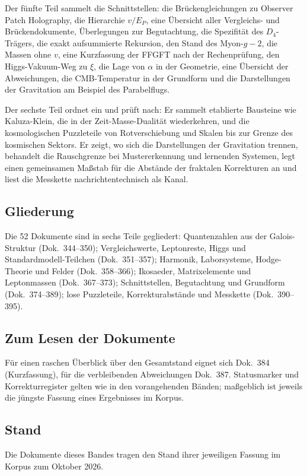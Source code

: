 Der fünfte Teil sammelt die Schnittstellen: die Brückengleichungen zu
Observer Patch Holography, die Hierarchie $v/E_P$, eine Übersicht aller
Vergleichs- und Brückendokumente, Überlegungen zur Begutachtung, die
Spezifität des $D_4$-Trägers, die exakt aufsummierte Rekursion, den Stand
des Myon-$g-2$, die Massen ohne $v$, eine Kurzfassung der FFGFT nach der
Rechenprüfung, den Higgs-Vakuum-Weg zu $\xi$, die Lage von $\alpha$ in der
Geometrie, eine Übersicht der Abweichungen, die CMB-Temperatur in der
Grundform und die Darstellungen der Gravitation am Beispiel des
Parabelflugs.

Der sechste Teil ordnet ein und prüft nach: Er sammelt etablierte Bausteine
wie Kaluza-Klein, die in der Zeit-Masse-Dualität wiederkehren, und die
kosmologischen Puzzleteile von Rotverschiebung und Skalen bis zur Grenze des
kosmischen Sektors. Er zeigt, wo sich die Darstellungen der Gravitation
trennen, behandelt die Rauschgrenze bei Mustererkennung und lernenden
Systemen, legt einen gemeinsamen Maßstab für die Abstände der fraktalen
Korrekturen an und liest die Messkette nachrichtentechnisch als Kanal.

\subsection*{Gliederung}

Die 52 Dokumente sind in sechs Teile gegliedert: Quantenzahlen aus der
Galois-Struktur (Dok.~344--350); Vergleichswerte, Leptonreste, Higgs und
Standardmodell-Teilchen (Dok.~351--357); Harmonik, Laborsysteme,
Hodge-Theorie und Felder (Dok.~358--366); Ikosaeder, Matrixelemente und
Leptonmassen (Dok.~367--373); Schnittstellen, Begutachtung und Grundform
(Dok.~374--389); lose Puzzleteile, Korrekturabstände und Messkette
(Dok.~390--395).

\subsection*{Zum Lesen der Dokumente}

Für einen raschen Überblick über den Gesamtstand eignet sich Dok.~384
(Kurzfassung), für die verbleibenden Abweichungen Dok.~387. Statusmarker
und Korrekturregister gelten wie in den vorangehenden Bänden; maßgeblich ist
jeweils die jüngste Fassung eines Ergebnisses im Korpus.

\subsection*{Stand}

Die Dokumente dieses Bandes tragen den Stand ihrer jeweiligen Fassung im
Korpus zum Oktober 2026.

